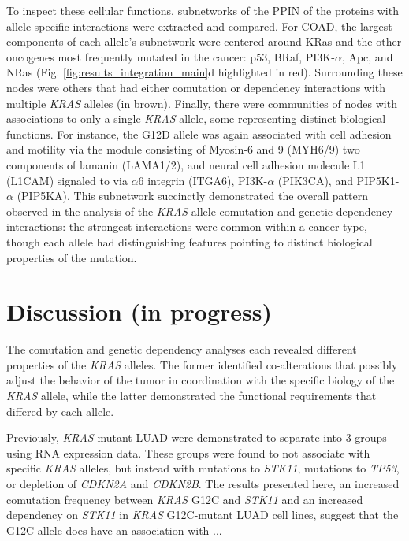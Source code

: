 \documentclass[english, 10pt, letterpaper]{article}
\newcommand{\KRAS}{\emph{KRAS}}
\newcommand{\kras}{KRas}
\begin{document}
To inspect these cellular functions, subnetworks of the PPIN of the proteins with allele-specific interactions were extracted and compared.
For COAD, the largest components of each allele's subnetwork were centered around \kras{} and the other oncogenes most frequently mutated in the cancer: p53, BRaf, PI3K-$\alpha$, Apc, and NRas (Fig. \ref{fig:results_integration_main}d highlighted in red).
Surrounding these nodes were others that had either comutation or dependency interactions with multiple \KRAS{} alleles (in brown).
Finally, there were communities of nodes with associations to only a single \KRAS{} allele, some representing distinct biological functions.
For instance, the G12D allele was again associated with cell adhesion and motility via the module consisting of Myosin-6 and 9 (MYH6/9) two components of lamanin (LAMA1/2), and neural cell adhesion molecule L1 (L1CAM) signaled to via $\alpha$6 integrin (ITGA6), PI3K-$\alpha$ (PIK3CA), and PIP5K1-$\alpha$ (PIP5KA).
This subnetwork succinctly demonstrated the overall pattern observed in the analysis of the \KRAS{} allele comutation and genetic dependency interactions: the strongest interactions were common within a cancer type, though each allele had distinguishing features pointing to distinct biological properties of the mutation.


\section*{Discussion (in progress)}


The comutation and genetic dependency analyses each revealed different properties of the \KRAS{} alleles.
The former identified co-alterations that possibly adjust the behavior of the tumor in coordination with the specific biology of the \KRAS{} allele, while the latter demonstrated the functional requirements that differed by each allele.

Previously, \KRAS{}-mutant LUAD were demonstrated to separate into 3 groups using RNA expression data.
These groups were found to not associate with specific \KRAS{} alleles, but instead with mutations to \emph{STK11}, mutations to \emph{TP53}, or depletion of \emph{CDKN2A} and \emph{CDKN2B}.
The results presented here, an increased comutation frequency between \KRAS{} G12C and \emph{STK11} and an increased dependency on \emph{STK11} in \KRAS{} G12C-mutant LUAD cell lines, suggest that the G12C allele does have an association with ...
\end{document}
